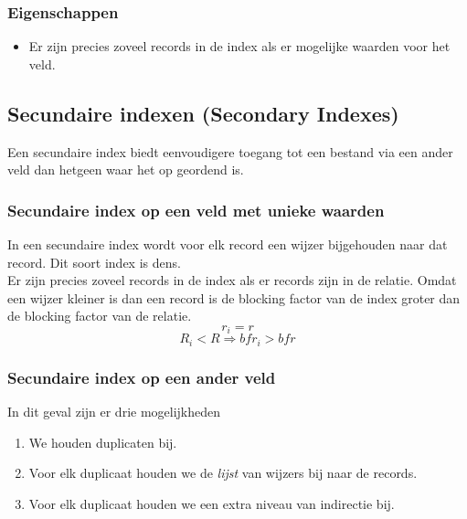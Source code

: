 \documentclass[indexstructuren.tex]{subfiles}
\begin{document}
\subsubsection*{Eigenschappen}
\begin{itemize}
\item
Er zijn precies zoveel records in de index als er mogelijke waarden voor het veld.
\end{itemize}

\subsection{Secundaire indexen (Secondary Indexes)}
Een secundaire index biedt eenvoudigere toegang tot een bestand via een ander veld dan hetgeen waar het op geordend is.

\subsubsection{Secundaire index op een veld met unieke waarden}
In een secundaire index wordt voor elk record een wijzer bijgehouden naar dat record. Dit soort index is dens.\\
Er zijn precies zoveel records in de index als er records zijn in de relatie. Omdat een wijzer kleiner is dan een record is de blocking factor van de index groter dan de blocking factor van de relatie.
\[
r_i = r
\]
\[
R_i < R \Rightarrow bfr_i > bfr
\]
\subsubsection{Secundaire index op een ander veld}
In dit geval zijn er drie mogelijkheden
\begin{enumerate}
\item We houden duplicaten bij.
\item Voor elk duplicaat houden we de \emph{lijst} van wijzers bij naar de records.
\item Voor elk duplicaat houden we een extra niveau van indirectie bij.
\end{enumerate}
\end{document}
